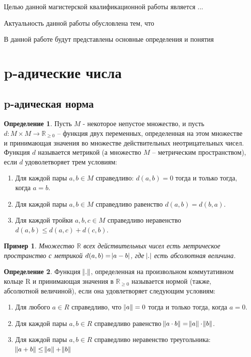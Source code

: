 \documentclass[master, och, diploma, times]{sty/SCWorks}
\theoremstyle{plain}
\newtheorem{exmp}{Пример}[section]
\theoremstyle{definition}
\newtheorem{defn}{Определение}[section]
\begin{document}
\intro
Целью данной магистерской квалификационной работы является ...

Актуальность данной работы обусловлена тем, что

В данной работе будут представлены основные определения и понятия


\section{p-адические числа}

\subsection{p-адическая норма}

\begin{defn}
Пусть $M$ - некоторое непустое множество, и пусть \linebreak ${d: M \times M \rightarrow \mathbb {R}_{\ge0}}$ -- функция двух переменных, определенная на этом множестве и принимающая значения во множестве действительных неотрицательных чисел. Функция $d$ называется метрикой (а множество $M$ -- метрическим пространством), если $d$ удоволетворяет трем условиям:

\begin{enumerate} 
	\item Для каждой пары $a, b \in M$ справедливо: $d(a, b)=0$ тогда и только тогда, когда $a=b$.
	\item Для каждой пары $a, b \in M$ справедливо равенство $d(a, b) = d(b, a)$.
	\item Для каждой тройки $a, b, c \in M$ справедливо неравенство $d(a, b) \le d(a, c) + d(c, b)$.
\end{enumerate}
\end{defn}

\begin{exmp}
Множество $\mathbb {R}$ всех действительных чисел есть метрическое пространство с метрикой $d(a, b)= \abs{a-b}$, где $\abs{.}$ есть абсолютная величина.
\end{exmp}


\begin{defn}
Функция $\norm{.}$, определенная на произвольном коммутативном кольце R и принимающая значения в $\mathbb {R}_{\ge 0}$ называется нормой (также, абсолютной величиной), если она удовлетворяет следующим условиям:

\begin{enumerate} 
	\item Для любого $a \in R$ справедливо, что $\norm{a}=0$ тогда и только тогда, когда $a=0$.
	\item Для каждой пары $a, b \in R$ справедливо равенство $\norm{a \cdot b} = \norm{a} \cdot \norm{b}$.
	\item Для каждой пары $a, b \in R$ справедливо неравенство треугольника: $\norm{a + b} \le \norm{a} + \norm{b}$
\end{enumerate}
\end{defn}
\end{document}
